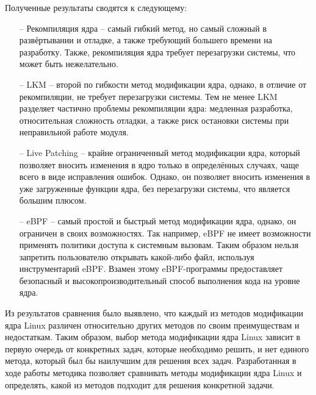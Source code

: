 Полученные результаты сводятся к следующему:
\begin{itemize}
    \item[--] Рекомпиляция ядра -- самый гибкий метод, но самый сложный в развёртывании и отладке, а также требующий большего времени на разработку.
    Также, рекомпиляция ядра требует перезагрузки системы, что может быть нежелательно.
    \item[--] LKM -- второй по гибкости метод модификации ядра, однако, в отличие от рекомпиляции, не требует перезагрузки системы.
    Тем не менее LKM разделяет частично проблемы рекомпиляции ядра: медленная разработка, относительная сложность отладки, а также риск остановки системы при неправильной работе модуля.
    \item[--] Live Patching -- крайне ограниченный метод модификации ядра, который позволяет вносить изменения в ядро только в определённых случаях, чаще всего в виде исправления ошибок.
    Однако, он позволяет вносить изменения в уже загруженные функции ядра, без перезагрузки системы, что является большим плюсом.
    \item[--] eBPF -- самый простой и быстрый метод модификации ядра, однако, он ограничен в своих возможностях.
    Так например, eBPF не имеет возможности применять политики доступа к системным вызовам.
    Таким образом нельзя запретить пользователю открывать какой-либо файл, используя инструментарий eBPF\@.
    Взамен этому eBPF-программы предоставляет безопасный и высокопроизводительный способ выполнения кода на уровне ядра.
\end{itemize}

\indent Из результатов сравнения было выявлено, что каждый из методов модификации ядра Linux различен относительно других методов по своим преимуществам и недостаткам.
Таким образом, выбор метода модификации ядра Linux зависит в первую очередь от конкретных задач, которые необходимо решить, и нет единого метода, который был бы наилучшим для решения всех задач.
Разработанная в ходе работы методика позволяет сравнивать методы модификации ядра Linux и определять, какой из методов подходит для решения конкретной задачи.
